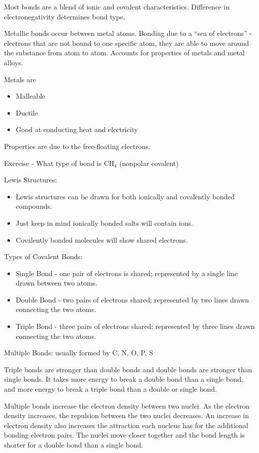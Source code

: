 \documentclass[../hchem.tex]{subfiles}
\begin{document}
Most bonds are a blend of ionic and covalent characteristics. Difference in electronegativity determines bond type.

Metallic bonds occur between metal atoms. Bonding due to a ``sea of electrons'' - electrons that are not bound 
to one specific atom, they are able to move around the substance from atom to atom. Accounts for properties of metals and metal alloys.

Metals are 
\begin{itemize}
    \item Malleable 
    \item Ductile 
    \item Good at conducting heat and electricity 
\end{itemize}

Properties are due to the free-floating electrons.

Exercise - What type of bond is CH$_4$ (nonpolar covalent)

Lewis Structures:
\begin{itemize}
    \item Lewis structures can be drawn for both ionically and covalently bonded compounds.
    \item Just keep in mind ionically bonded salts will contain ions.
    \item Covalently bonded molecules will show shared electrons.
\end{itemize}

Types of Covalent Bonds:
\begin{itemize}
    \item Single Bond - one pair of electrons is shared; represented by a single line drawn between two atoms.
    \item Double Bond - two pairs of electrons shared; represented by two lines drawn connecting the two atoms.
    \item Triple Bond - three pairs of electrons shared; represented by three lines drawn connecting the two atoms. 
\end{itemize}

Multiple Bonds: usually formed by C, N, O, P, S

Triple bonds are stronger than double bonds and double bonds are stronger than single bonds.
It takes more energy to break a double bond than a single bond, and more energy to break a triple bond than a double or single bond.

Multiple bonds increase the electron density between two nuclei. As the electron density increases, the repulsion 
between the two nuclei decreases. An increase in electron density also increases the attraction each nucleus has for the additional 
bonding electron pairs. The nuclei move closer together and the bond length is shorter for a double bond than a single bond.
\end{document}

